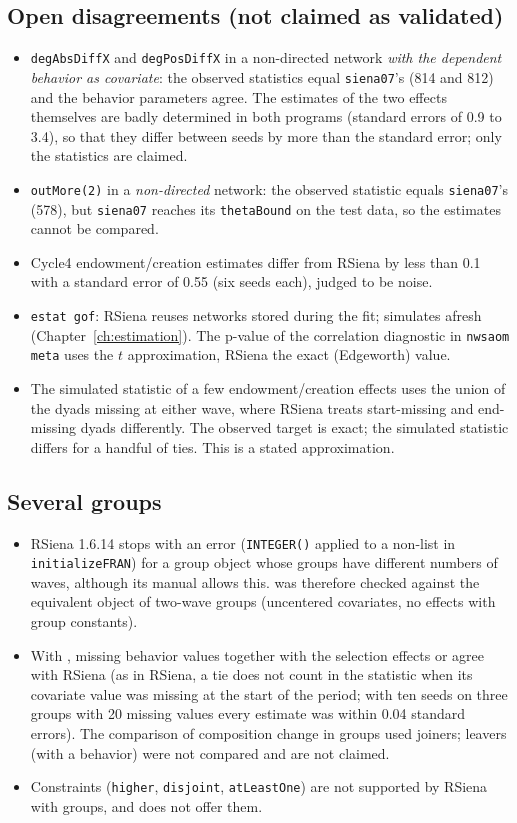 \subsection{Open disagreements (not claimed as validated)}
\begin{itemize}
\item \texttt{degAbsDiffX} and \texttt{degPosDiffX} in a non-directed network \emph{with the dependent behavior as covariate}: the observed statistics equal \texttt{siena07}'s (814 and 812) and the behavior parameters agree. The estimates of the two effects themselves are badly determined in both programs (standard errors of 0.9 to 3.4), so that they differ between seeds by more than the standard error; only the statistics are claimed.
\item \texttt{outMore(2)} in a \emph{non-directed} network: the observed statistic equals \texttt{siena07}'s (578), but \texttt{siena07} reaches its \texttt{thetaBound} on the test data, so the estimates cannot be compared.
\item Cycle4 endowment/creation estimates differ from RSiena by less than 0.1 with a standard error of 0.55 (six seeds each), judged to be noise.
\item \texttt{estat gof}: RSiena reuses networks stored during the fit; \nwsaom{} simulates afresh (Chapter~\ref{ch:estimation}). The p-value of the correlation diagnostic in \texttt{nwsaom meta} uses the $t$ approximation, RSiena the exact (Edgeworth) value.
\item The simulated statistic of a few endowment/creation effects uses the union of the dyads missing at either wave, where RSiena treats start-missing and end-missing dyads differently. The observed target is exact; the simulated statistic differs for a handful of ties. This is a stated approximation.
\end{itemize}

\subsection{Several groups}
\begin{itemize}
\item RSiena 1.6.14 stops with an error (\texttt{INTEGER()} applied to a non-list in \texttt{initializeFRAN}) for a group object whose groups have different numbers of waves, although its manual allows this.  was therefore checked against the equivalent object of two-wave groups (uncentered covariates, no effects with group constants).
\item With , missing behavior values together with the selection effects  or  agree with RSiena (as in RSiena, a tie does not count in the statistic when its covariate value was missing at the start of the period; with ten seeds on three groups with 20 missing values every estimate was within 0.04 standard errors). The comparison of composition change in groups used joiners; leavers (with a behavior) were not compared and are not claimed.
\item Constraints (\texttt{higher}, \texttt{disjoint}, \texttt{atLeastOne}) are not supported by RSiena with groups, and \nwsaom{} does not offer them.
\end{itemize}

